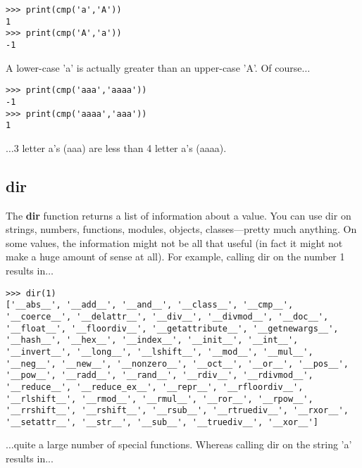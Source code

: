 \begin{Verbatim}[frame=single]
>>> print(cmp('a','A'))
1
>>> print(cmp('A','a'))
-1
\end{Verbatim}

A lower-case 'a' is actually greater than an upper-case 'A'. Of course$\ldots$

\begin{Verbatim}[frame=single]
>>> print(cmp('aaa','aaaa'))
-1
>>> print(cmp('aaaa','aaa'))
1
\end{Verbatim}

\noindent
$\ldots$3 letter a's (aaa) are less than 4 letter a's (aaaa).

\subsection*{dir}

The \textbf{dir} function returns a list of information about a value.  You can use dir on strings, numbers, functions, modules, objects, classes---pretty much anything.  On some values, the information might not be all that useful (in fact it might not make a huge amount of sense at all).  For example, calling dir on the number 1 results in$\ldots$

\begin{Verbatim}[frame=single]
>>> dir(1)
['__abs__', '__add__', '__and__', '__class__', '__cmp__',
'__coerce__', '__delattr__', '__div__', '__divmod__', '__doc__',
'__float__', '__floordiv__', '__getattribute__', '__getnewargs__',
'__hash__', '__hex__', '__index__', '__init__', '__int__',
'__invert__', '__long__', '__lshift__', '__mod__', '__mul__',
'__neg__', '__new__', '__nonzero__', '__oct__', '__or__', '__pos__', '__pow__', '__radd__', '__rand__', '__rdiv__', '__rdivmod__',
'__reduce__', '__reduce_ex__', '__repr__', '__rfloordiv__',
'__rlshift__', '__rmod__', '__rmul__', '__ror__', '__rpow__',
'__rrshift__', '__rshift__', '__rsub__', '__rtruediv__', '__rxor__',
'__setattr__', '__str__', '__sub__', '__truediv__', '__xor__']
\end{Verbatim}

$\ldots$quite a large number of special functions. Whereas calling dir on the string 'a' results in...

